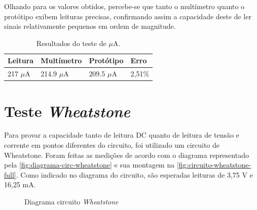 Olhando para os valores obtidos, percebe-se que tanto o multímetro quanto o protótipo exibem leituras precisas, confirmando assim a capacidade deste de ler sinais relativamente pequenos em ordem de magnitude.

\begin{table}[!ht]
    \centering
    \caption{Resultados do teste de $\mu$A.}
    \label{tab:resultados-ua}
    \begin{tabular}{ l l l l }
        \hline
        \textbf{Leitura}  & \textbf{Multímetro}  & \textbf{Protótipo}  & \textbf{Erro}   \\ \hline
        217 $\mu$A        & 214.9 $\mu$A         & 209.5 $\mu$A        & 2,51\%             \\ \hline
    \end{tabular}
    \fonte{}
\end{table}

\section{Teste \textit{Wheatstone}}\label{teste-Wheatstone}

Para provar a capacidade tanto de leitura DC quanto de leitura de tensão e corrente em pontos diferentes do circuito, foi utilizado um circuito de Wheatstone. Foram feitas as medições de acordo com o diagrama representado pela \autoref{fig:diagrama-circ-wheatstone} e sua montagem na \autoref{fig:circuito-wheatstone-full}. Como indicado no diagrama do circuito, são esperadas leituras de 3,75 V e 16,25 mA.

\begin{figure}[htb!]
    \caption{Diagrama circuito \textit{Wheatstone}}
    \label{fig:diagrama-circ-wheatstone}
    \fonte{}
\end{figure}

